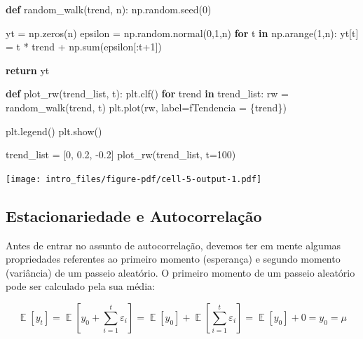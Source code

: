 \documentclass[
  letterpaper,
  DIV=11,
  numbers=noendperiod]{scrreprt}
\newenvironment{Shaded}{\begin{snugshade}}{\end{snugshade}}
\newcommand{\BuiltInTok}[1]{\textcolor[rgb]{0.00,0.23,0.31}{#1}}
\newcommand{\ControlFlowTok}[1]{\textcolor[rgb]{0.00,0.23,0.31}{\textbf{#1}}}
\newcommand{\DecValTok}[1]{\textcolor[rgb]{0.68,0.00,0.00}{#1}}
\newcommand{\FloatTok}[1]{\textcolor[rgb]{0.68,0.00,0.00}{#1}}
\newcommand{\KeywordTok}[1]{\textcolor[rgb]{0.00,0.23,0.31}{\textbf{#1}}}
\newcommand{\NormalTok}[1]{\textcolor[rgb]{0.00,0.23,0.31}{#1}}
\newcommand{\OperatorTok}[1]{\textcolor[rgb]{0.37,0.37,0.37}{#1}}
\newcommand{\SpecialCharTok}[1]{\textcolor[rgb]{0.37,0.37,0.37}{#1}}
\newcommand{\SpecialStringTok}[1]{\textcolor[rgb]{0.13,0.47,0.30}{#1}}
\DeclareMathOperator{\EX}{\mathbb{E}}
\theoremstyle{definition}
\theoremstyle{plain}
\theoremstyle{remark}
\begin{document}
\begin{Shaded}
\begin{Highlighting}[]
\KeywordTok{def}\NormalTok{ random\_walk(trend, n):}
\NormalTok{    np.random.seed(}\DecValTok{0}\NormalTok{)}
    
\NormalTok{    yt }\OperatorTok{=}\NormalTok{ np.zeros(n)}
\NormalTok{    epsilon }\OperatorTok{=}\NormalTok{ np.random.normal(}\DecValTok{0}\NormalTok{,}\DecValTok{1}\NormalTok{,n)}
    \ControlFlowTok{for}\NormalTok{ t }\KeywordTok{in}\NormalTok{ np.arange(}\DecValTok{1}\NormalTok{,n):}
\NormalTok{        yt[t] }\OperatorTok{=}\NormalTok{ t }\OperatorTok{*}\NormalTok{ trend }\OperatorTok{+}\NormalTok{ np.}\BuiltInTok{sum}\NormalTok{(epsilon[:t}\OperatorTok{+}\DecValTok{1}\NormalTok{])}
    
    \ControlFlowTok{return}\NormalTok{ yt}


\KeywordTok{def}\NormalTok{ plot\_rw(trend\_list, t):}
\NormalTok{    plt.clf()}
    \ControlFlowTok{for}\NormalTok{ trend }\KeywordTok{in}\NormalTok{ trend\_list:}
\NormalTok{        rw }\OperatorTok{=}\NormalTok{ random\_walk(trend, t)}
\NormalTok{        plt.plot(rw, label}\OperatorTok{=}\SpecialStringTok{f\textquotesingle{}Tendencia = }\SpecialCharTok{\{}\NormalTok{trend}\SpecialCharTok{\}}\SpecialStringTok{\textquotesingle{}}\NormalTok{)}
    
\NormalTok{    plt.legend()}
\NormalTok{    plt.show()}

\NormalTok{trend\_list }\OperatorTok{=}\NormalTok{ [}\DecValTok{0}\NormalTok{, }\FloatTok{0.2}\NormalTok{, }\OperatorTok{{-}}\FloatTok{0.2}\NormalTok{]}
\NormalTok{plot\_rw(trend\_list, t}\OperatorTok{=}\DecValTok{100}\NormalTok{)}
\end{Highlighting}
\end{Shaded}

\texttt{[image: intro\_files/figure-pdf/cell-5-output-1.pdf]}

\subsection{Estacionariedade e
Autocorrelação}\label{estacionariedade-e-autocorrelauxe7uxe3o}

Antes de entrar no assunto de autocorrelação, devemos ter em mente
algumas propriedades referentes ao primeiro momento (esperança) e
segundo momento (variância) de um passeio aleatório. O primeiro momento
de um passeio aleatório pode ser calculado pela sua média:

\[
\EX[y_{t}] = \EX[y_{0} + \sum_{i=1}^{t} \varepsilon_{i}] = \EX[y_{0}] + \EX[\sum_{i=1}^{t} \varepsilon_{i}] = \EX[y_{0}] + 0 = y_{0} = \mu
\]
\end{document}
